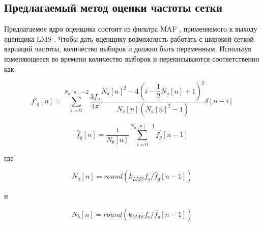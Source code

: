 \subsection{Предлагаемый метод оценки частоты сетки} \label{sec:ch2/sec1_3}
Предлагаемое ядро оценщика состоит из фильтра MAF , применяемого к выходу оценщика LMS . Чтобы дать оценщику возможность работать с широкой сеткой вариаций частоты, количество выборок  и  должно быть переменным. Используя изменяющееся во времени количество выборок  и  переписываются соответственно как:

\begin{equation}\label{eq:equation126}
f\prime_g[n]= \sum\limits_{i=0}^{N_a[n]-2} \dfrac{3f_s}{4\pi} \dfrac{N_a[n]^2-4(i-\dfrac{1}{2} N_a[n]+1)^2}{N_a[n](N_a[n]^2-1)} \delta [n-i]
\end{equation}

\begin{equation}\label{eq:equation127}
\hat{f}_g[n] =\dfrac{1}{N_b[n]}  \sum\limits_{i=0}^{N_a[n]-1} f^\prime_g[n-1]
\end{equation}

где 

\begin{equation}\label{eq:equation128}
N_a[n] = round(k_{LMS} f_s / \hat{f}_g[n-1])
\end{equation}

и

\begin{equation}\label{eq:equation129}
N_b[n] = round(k_{MAF} f_s / \hat{f}_g[n-1])
\end{equation}



